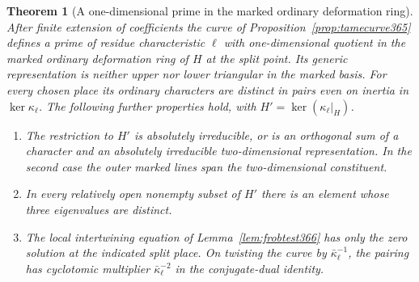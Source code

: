 \documentclass[a4paper,11pt]{article}
\newtheorem{theorem}[proposition]{Theorem}
\theoremstyle{definition}
\theoremstyle{remark}
\numberwithin{equation}{section}
\begin{document}
\begin{theorem}[A one-dimensional prime in the marked ordinary deformation ring]
\label{thm:markedcurve366}
After finite extension of coefficients the curve of
Proposition~\ref{prop:tamecurve365} defines a prime of
residue characteristic \(\ell\) with one-dimensional quotient
in the marked ordinary deformation ring of \(H\) at the split
point. Its generic representation is neither upper nor lower
triangular in the marked basis. For every chosen place its
ordinary characters are distinct in pairs even on inertia
in \(\ker\kappa_\ell\). The following further properties
hold, with \(H'=\ker(\kappa_\ell|_H)\).

\begin{enumerate}
\item The restriction to \(H'\) is absolutely irreducible,
or is an orthogonal sum of a character and an absolutely
irreducible two-dimensional representation. In the second
case the outer marked lines span the two-dimensional
constituent.
\item In every relatively open nonempty subset of \(H'\)
there is an element whose three eigenvalues are distinct.
\item The local intertwining equation of
Lemma~\ref{lem:frobtest366} has only the zero solution at
the indicated split place. On twisting the curve by
\(\bar\kappa_\ell^{-1}\), the pairing has cyclotomic
multiplier \(\bar\kappa_\ell^{-2}\) in the conjugate-dual
identity.
\end{enumerate}
\end{theorem}
\end{document}
